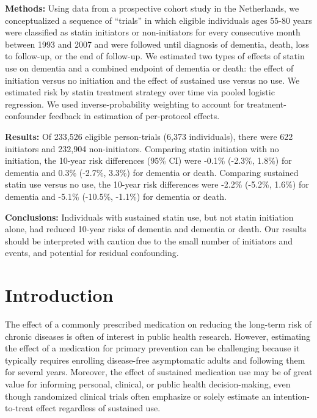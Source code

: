 \documentclass[
]{book}
\begin{document}
\textbf{Methods:} Using data from a prospective cohort study in the Netherlands, we conceptualized a sequence of ``trials'' in which eligible individuals ages 55-80 years were classified as statin initiators or non-initiators for every consecutive month between 1993 and 2007 and were followed until diagnosis of dementia, death, loss to follow-up, or the end of follow-up. We estimated two types of effects of statin use on dementia and a combined endpoint of dementia or death: the effect of initiation versus no initiation and the effect of sustained use versus no use. We estimated risk by statin treatment strategy over time via pooled logistic regression. We used inverse-probability weighting to account for treatment-confounder feedback in estimation of per-protocol effects.

\textbf{Results:} Of 233,526 eligible person-trials (6,373 individuals), there were 622 initiators and 232,904 non-initiators. Comparing statin initiation with no initiation, the 10-year risk differences (95\% CI) were -0.1\% (-2.3\%, 1.8\%) for dementia and 0.3\% (-2.7\%, 3.3\%) for dementia or death. Comparing sustained statin use versus no use, the 10-year risk differences were -2.2\% (-5.2\%, 1.6\%) for dementia and -5.1\% (-10.5\%, -1.1\%) for dementia or death.

\textbf{Conclusions:} Individuals with sustained statin use, but not statin initiation alone, had reduced 10-year risks of dementia and dementia or death. Our results should be interpreted with caution due to the small number of initiators and events, and potential for residual confounding.

\newpage

\hypertarget{introduction}{%
\section{Introduction}\label{introduction}}

The effect of a commonly prescribed medication on reducing the long-term risk of chronic
diseases is often of interest in public health research. However, estimating the effect of a medication for primary prevention can be challenging because it typically requires enrolling disease-free asymptomatic adults and following them for several years. Moreover, the effect of sustained medication use may be of great value for informing personal, clinical, or public health decision-making, even though randomized clinical trials often emphasize or solely estimate an intention-to-treat effect regardless of sustained use\autocite{hernan_itt2012}.
\end{document}
